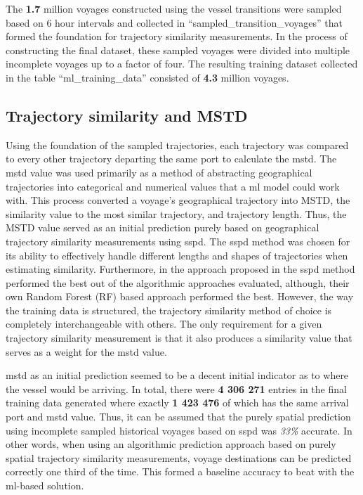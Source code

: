 The \textbf{1.7} million voyages constructed using the vessel transitions were sampled based on 6 hour intervals and collected in ``sampled\_transition\_voyages'' that formed the foundation for trajectory similarity measurements. In the process of constructing the final dataset, these sampled voyages were divided into multiple incomplete voyages up to a factor of four. The resulting training dataset collected in the table ``ml\_training\_data'' consisted of \textbf{4.3} million voyages.

\subsection{Trajectory similarity and MSTD}

Using the foundation of the sampled trajectories, each trajectory was compared to every other trajectory departing the same port to calculate the \acrfull{mstd}. The \acrshort{mstd} value was used primarily as a method of abstracting geographical trajectories into categorical and numerical values that a \acrfull{ml} model could work with. This process converted a voyage's geographical trajectory into MSTD, the similarity value to the most similar trajectory, and trajectory length. Thus, the MSTD value served as an initial prediction purely based on geographical trajectory similarity measurements using \acrfull{sspd}. The \acrshort{sspd} method was chosen for its ability to effectively handle different lengths and shapes of trajectories when estimating similarity. Furthermore, in the approach proposed in \cite{Zhang2020AISApproach} the \acrshort{sspd} method performed the best out of the algorithmic approaches evaluated, although, their own Random Forest (RF) based approach performed the best. However, the way the training data is structured, the trajectory similarity method of choice is completely interchangeable with others. The only requirement for a given trajectory similarity measurement is that it also produces a similarity value that serves as a weight for the \acrshort{mstd} value.

\acrshort{mstd} as an initial prediction seemed to be a decent initial indicator as to where the vessel would be arriving. In total, there were \textbf{4 306 271} entries in the final training data generated where exactly \textbf{1 423 476} of which has the same arrival port and \acrshort{mstd} value. Thus, it can be assumed that the purely spatial prediction using incomplete sampled historical voyages based on \acrshort{sspd} was \textit{33\%} accurate. In other words, when using an algorithmic prediction approach based on purely spatial trajectory similarity measurements, voyage destinations can be predicted correctly one third of the time. This formed a baseline accuracy to beat with the \acrshort{ml}-based solution.

